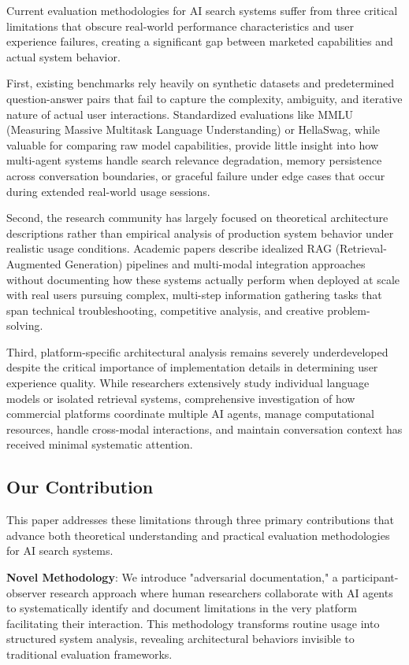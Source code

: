\documentclass[12pt]{article}
\begin{document}
Current evaluation methodologies for AI search systems suffer from three critical limitations that obscure real-world performance characteristics and user experience failures, creating a significant gap between marketed capabilities and actual system behavior.

First, existing benchmarks rely heavily on synthetic datasets and predetermined question-answer pairs that fail to capture the complexity, ambiguity, and iterative nature of actual user interactions. Standardized evaluations like MMLU (Measuring Massive Multitask Language Understanding) or HellaSwag, while valuable for comparing raw model capabilities, provide little insight into how multi-agent systems handle search relevance degradation, memory persistence across conversation boundaries, or graceful failure under edge cases that occur during extended real-world usage sessions.

Second, the research community has largely focused on theoretical architecture descriptions rather than empirical analysis of production system behavior under realistic usage conditions. Academic papers describe idealized RAG (Retrieval-Augmented Generation) pipelines and multi-modal integration approaches without documenting how these systems actually perform when deployed at scale with real users pursuing complex, multi-step information gathering tasks that span technical troubleshooting, competitive analysis, and creative problem-solving.

Third, platform-specific architectural analysis remains severely underdeveloped despite the critical importance of implementation details in determining user experience quality. While researchers extensively study individual language models or isolated retrieval systems, comprehensive investigation of how commercial platforms coordinate multiple AI agents, manage computational resources, handle cross-modal interactions, and maintain conversation context has received minimal systematic attention.

\subsection{Our Contribution}

This paper addresses these limitations through three primary contributions that advance both theoretical understanding and practical evaluation methodologies for AI search systems.

\textbf{Novel Methodology}: We introduce "adversarial documentation," a participant-observer research approach where human researchers collaborate with AI agents to systematically identify and document limitations in the very platform facilitating their interaction. This methodology transforms routine usage into structured system analysis, revealing architectural behaviors invisible to traditional evaluation frameworks.
\end{document}
